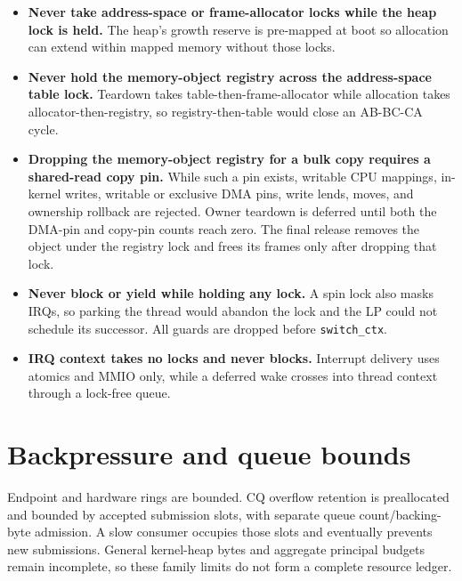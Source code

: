 \begin{itemize}
    \item \textbf{Never take address-space or frame-allocator locks while the
        heap lock is held.} The heap's growth reserve is pre-mapped at boot so
        allocation can extend within mapped memory without those locks.
    \item \textbf{Never hold the memory-object registry across the
        address-space table lock.} Teardown takes table-then-frame-allocator
        while allocation takes allocator-then-registry, so registry-then-table
        would close an AB-BC-CA cycle.
    \item \textbf{Dropping the memory-object registry for a bulk copy requires
        a shared-read copy pin.} While such a pin exists, writable CPU
        mappings, in-kernel writes, writable or exclusive DMA pins, write
        lends, moves, and ownership rollback are rejected. Owner teardown is
        deferred until both the DMA-pin and copy-pin counts reach zero. The
        final release removes the object under the registry lock and frees its
        frames only after dropping that lock.
    \item \textbf{Never block or yield while holding any lock.} A spin lock
        also masks IRQs, so parking the thread would abandon the lock and the
        LP could not schedule its successor. All guards are dropped before
        \texttt{switch\_ctx}.
    \item \textbf{IRQ context takes no locks and never blocks.} Interrupt
        delivery uses atomics and MMIO only, while a deferred wake crosses into
        thread context through a lock-free queue.
\end{itemize}

\section{Backpressure and queue bounds}

Endpoint and hardware rings are bounded. CQ overflow retention is preallocated
and bounded by accepted submission slots, with separate queue count/backing-byte
admission. A slow consumer occupies those slots and eventually prevents new
submissions. General kernel-heap bytes and aggregate principal budgets remain
incomplete, so these family limits do not form a complete resource ledger.

